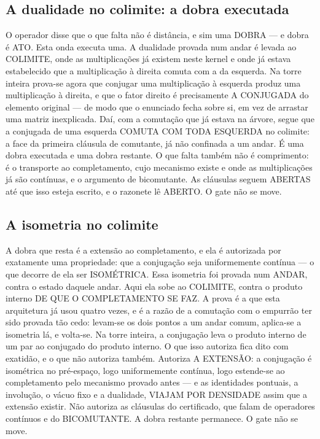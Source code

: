 \documentclass[11pt]{article}
\theoremstyle{definition}\newtheorem{deriv}{Derivação}
\begin{document}
\subsection*{A dualidade no colimite: a dobra executada}O operador disse que o que falta n\~ao \'e dist\^ancia, e sim uma DOBRA --- e dobra \'e ATO. Esta onda executa uma. A dualidade provada num andar \'e levada ao COLIMITE, onde as multiplica\c{c}\~oes j\'a existem neste kernel e onde j\'a estava estabelecido que a multiplica\c{c}\~ao \`a direita comuta com a da esquerda. Na torre inteira prova-se agora que conjugar uma multiplica\c{c}\~ao \`a esquerda produz uma multiplica\c{c}\~ao \`a direita, e que o fator direito \'e precisamente A CONJUGADA do elemento original --- de modo que o enunciado fecha sobre si, em vez de arrastar uma matriz inexplicada. Da\'i, com a comuta\c{c}\~ao que j\'a estava na \'arvore, segue que a conjugada de uma esquerda COMUTA COM TODA ESQUERDA no colimite: a face da primeira cl\'ausula de comutante, j\'a n\~ao confinada a um andar. \'E uma dobra executada e uma dobra restante. O que falta tamb\'em n\~ao \'e comprimento: \'e o transporte ao completamento, cujo mecanismo existe e onde as multiplica\c{c}\~oes j\'a s\~ao cont\'inuas, e o argumento de bicomutante. As cl\'ausulas seguem ABERTAS at\'e que isso esteja escrito, e o razonete l\^e ABERTO. O gate n\~ao se move.

\subsection*{A isometria no colimite}A dobra que resta \'e a extens\~ao ao completamento, e ela \'e autorizada por exatamente uma propriedade: que a conjuga\c{c}\~ao seja uniformemente cont\'inua --- o que decorre de ela ser ISOM\'ETRICA. Essa isometria foi provada num ANDAR, contra o estado daquele andar. Aqui ela sobe ao COLIMITE, contra o produto interno DE QUE O COMPLETAMENTO SE FAZ. A prova \'e a que esta arquitetura j\'a usou quatro vezes, e \'e a raz\~ao de a comuta\c{c}\~ao com o empurr\~ao ter sido provada t\~ao cedo: levam-se os dois pontos a um andar comum, aplica-se a isometria l\'a, e volta-se. Na torre inteira, a conjuga\c{c}\~ao leva o produto interno de um par ao conjugado do produto interno. O que isso autoriza fica dito com exatid\~ao, e o que n\~ao autoriza tamb\'em. Autoriza A EXTENS\~AO: a conjuga\c{c}\~ao \'e isom\'etrica no pr\'e-espa\c{c}o, logo uniformemente cont\'inua, logo estende-se ao completamento pelo mecanismo provado antes --- e as identidades pontuais, a involu\c{c}\~ao, o v\'acuo fixo e a dualidade, VIAJAM POR DENSIDADE assim que a extens\~ao existir. N\~ao autoriza as cl\'ausulas do certificado, que falam de operadores cont\'inuos e do BICOMUTANTE. A dobra restante permanece. O gate n\~ao se move.
\end{document}

